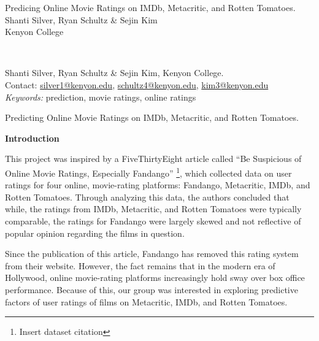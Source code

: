 \documentclass[a4paper,12pt]{report}
\begin{document}
	\thispagestyle{plain}
	\begin{center}
		\vspace*{150pt}
		Predicing Online Movie Ratings on IMDb, Metacritic, and Rotten Tomatoes. \\
		Shanti Silver, Ryan Schultz \& Sejin Kim \\
		Kenyon College \\
	\end{center}
	\vspace*{120pt}
	 \\
	\begin{raggedright}
		Shanti Silver, Ryan Schultz \& Sejin Kim, Kenyon College. \\
		Contact: \href{mailto:silver1@kenyon.edu}{silver1@kenyon.edu}, \href{mailto:schultz4@kenyon.edu}{schultz4@kenyon.edu}, \href{mailto:kim3@kenyon.edu}{kim3@kenyon.edu} \\
		\vspace*{40pt}
		\textit{Keywords:} prediction, movie ratings, online ratings
	\end{raggedright}
	
	\newpage

	\begin{center}
		Predicting Online Movie Ratings on IMDb, Metacritic, and Rotten Tomatoes.
	\end{center}
	\begin{center}
		\textbf{Introduction}
	\end{center}
	\justify
	This project was inspired by a FiveThirtyEight article called “Be Suspicious of Online Movie Ratings, Especially Fandango” \footnote{Insert dataset citation}, which collected data on user ratings for four online, movie-rating platforms: Fandango, Metacritic, IMDb, and Rotten Tomatoes. Through analyzing this data, the authors concluded that while, the ratings from IMDb, Metacritic, and Rotten Tomatoes were typically comparable, the ratings for Fandango were largely skewed and not reflective of popular opinion regarding the films in question. 

	Since the publication of this article, Fandango has removed this rating system from their website. However, the fact remains that in the modern era of Hollywood, online movie-rating platforms increasingly hold sway over box office performance. Because of this, our group was interested in exploring predictive factors of user ratings of films on Metacritic, IMDb, and Rotten Tomatoes. 
\end{document}
